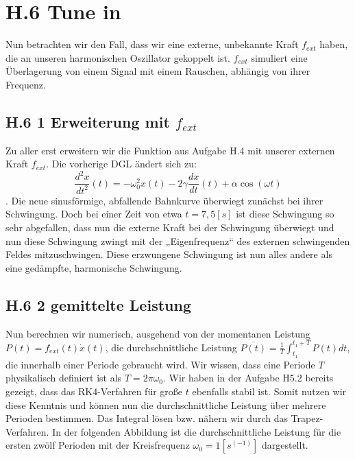 \documentclass[ngerman]{scrartcl}
\begin{document}
\section{H.6 Tune in}
Nun betrachten wir den Fall, dass wir eine externe, unbekannte Kraft $f_{ext}$ haben, die an unseren harmonischen Oszillator gekoppelt ist. $f_{ext}$ simuliert eine Überlagerung von einem Signal mit einem Rauschen, abhängig von ihrer Frequenz. 
\subsection{H.6 1 Erweiterung mit $f_{ext}$}
Zu aller erst erweitern wir die Funktion aus Aufgabe H.4 mit unserer externen Kraft $f_{ext}$. Die vorherige DGL ändert sich zu: \begin{equation}  \frac{d^2x}{dt^2}(t) = -\omega_0^2x(t) - 2\gamma\frac{dx}{dt}(t) + \alpha\cos(\omega t)  \end{equation}. Die neue sinusförmige, abfallende Bahnkurve überwiegt zunächst bei ihrer Schwingung. Doch bei einer Zeit von etwa $t=7,5[s]$ ist diese Schwingung so sehr abgefallen, dass nun die externe Kraft bei der Schwingung überwiegt und nun diese Schwingung zwingt mit der „Eigenfrequenz“ des externen schwingenden Feldes mitzuschwingen. Diese erzwungene Schwingung ist nun alles andere als eine gedämpfte, harmonische Schwingung. 
\subsection{H.6 2 gemittelte Leistung}
Nun berechnen wir numerisch, ausgehend von der momentanen Leistung $P(t) = f_{ext}(t)\dot{x}(t)$,  die durchschnittliche Leistung $\overline{P(t)} = \frac{1}{T}\int_{t_1}^{t_1+T}P(t)dt$, die innerhalb einer Periode gebraucht wird. Wir wissen, dass eine Periode $T$ physikalisch definiert ist als $T = 2\pi\omega_0$. Wir haben in der Aufgabe H5.2 bereits gezeigt, dass das RK4-Verfahren für große $t$ ebenfalls stabil ist. Somit nutzen wir diese Kenntnis und können nun die durchschnittliche Leistung über mehrere Perioden bestimmen. Das Integral lösen bzw. nähern wir durch das Trapez-Verfahren. In der folgenden Abbildung ist die durchschnittliche Leistung für die ersten zwölf Perioden mit der Kreisfrequenz $\omega_0=1 [s^(-1)]$ dargestellt. 
\end{document}
